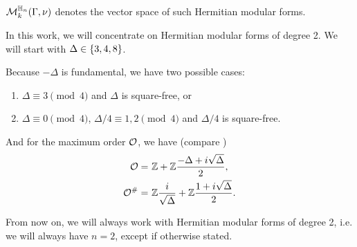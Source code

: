 $\operatorname{\mathcal{M}}^{\mathbb{H}_{n}}_k (\Gamma,\nu)$
denotes the vector space of such Hermitian modular forms.

In this work, we will concentrate on Hermitian modular forms of degree 2. We will start with $\Delta \in \Set{3,4,8}$.

Because $-\Delta$ is fundamental, we have two possible cases:
\begin{enumerate}
\item $\Delta \equiv 3 \pmod{4}$ and $\Delta$ is square-free, or
\item $\Delta \equiv 0 \pmod{4}$, $\Delta/4 \equiv 1,2 \pmod{4}$ and $\Delta/4$ is square-free.
\end{enumerate}
And for the maximum order $\mathcal{O}$, we have (compare \cite{Dern01Herm})
\begin{align*}
\mathcal{O} = &\ \mathbb{Z} +  \mathbb{Z} \frac{-\Delta+i\sqrt{\Delta}}{2} , \\
\mathcal{O}^\# = & \ \mathbb{Z} \frac{i}{\sqrt{\Delta}} + \mathbb{Z} \frac{1 + i\sqrt{\Delta}}{2} .
\end{align*}

From now on, we will always work with Hermitian modular forms of degree 2, i.e. we will always have $n=2$, except if otherwise stated.

